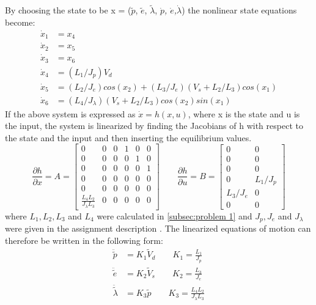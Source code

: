 %
By choosing the state to be x = ($\tilde{p}$, $\tilde{e}$,
$\tilde{\lambda}$, \textit{$\dot{p}$, $\dot{e}$,$\dot{\lambda}$}) the
nonlinear state equations become:
%
\begin{subequations}
  \label{eq:full state equations}
  \begin{align}
    \dot{x}_1 &= x_4 \\
    \dot{x}_2 &= x_5 \\
    \dot{x}_3 &= x_6 \\
    \dot{x}_4 &= (L_1/J_p) V_d \\
    \dot{x}_5 &= (L_2/J_e)cos(x_2) + (L_3/J_e)(V_s + L_2 / L_3)cos(x_1) \\
    \dot{x}_6 &= (L_4 / J_\lambda) (V_s + L_2 / L_3)cos(x_2)sin(x_1)
  \end{align}
\end{subequations}
If the above system is expressed as $\dot{x} = h(x, u)$, where x is
the state and u is the input, the system is linearized by finding the
Jacobians of h with respect to the state and the input and then
inserting the equilibrium values.
%
\begin{equation}
  \label{eq:Linearized Jacobians}
  \frac{\partial h}{\partial x} = A =
  \begin{bmatrix}
    0 & 0 & 0 & 1 & 0 & 0 \\
    0 & 0 & 0 & 0 & 1 & 0 \\
    0 & 0 & 0 & 0 & 0 & 1 \\
    0 & 0 & 0 & 0 & 0 & 0 \\
    0 & 0 & 0 & 0 & 0 & 0 \\
    \frac{L_4L_2}{J_\lambda L_3} & 0 & 0 & 0 & 0 & 0
  \end{bmatrix}
  \qquad
  \frac{\partial h}{\partial u} = B =
  \begin{bmatrix}
    0 & 0 \\
    0 & 0 \\
    0 & 0 \\
    0 & L_1/J_p \\
    L_3/J_e & 0 \\
    0 & 0
  \end{bmatrix}
\end{equation}
where $L_1, L_2, L_3$ and $L_4$ were calculated in
\cref{subsec:problem 1} and $J_p, J_e$ and $J_\lambda$ were given in
the assignment description \cite[p.14]{assignment}.
%
The linearized equations of motion can therefore be written in the
following form:
%
\begin{subequations}
  \label{eq:linearized EoM}
  \begin{align}
    \ddot{\tilde{p}} &=
    K_1\tilde{V}_d \qquad K_1 = \frac{L_1}{J_p}
    \label{eq:linearized pitch EoM}\\
    \ddot{\tilde{e}} &=
    K_2\tilde{V}_s \qquad K_2 = \frac{L_3}{J_e}
    \label{eq:linearized elevation EoM}\\
    \ddot{\tilde{\lambda}} &=
    K_3\tilde{p} \qquad K_3 = \frac{L_4L_2}{J_\lambda L_3}
    \label{eq:linearized travel EoM}
  \end{align}
\end{subequations}

